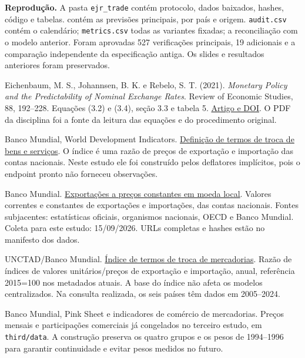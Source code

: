 \documentclass[10pt,a4paper]{article}
\newcommand{\pagina}[1]{\clearpage{\Large\bfseries\color{navy} #1}\par\vspace{6pt}}
\begin{document}
\textbf{Reprodução.} A pasta \texttt{ejr\_trade} contém protocolo, dados baixados, hashes, código e tabelas.  contém as previsões principais, por país e origem. \texttt{audit.csv} contém o calendário; \texttt{metrics.csv} todas as variantes fixadas;  a reconciliação com o modelo anterior. Foram aprovadas 527 verificações principais, 19 adicionais e a comparação independente da especificação antiga. Os slides e resultados anteriores foram preservados.

\pagina{Referências e definições de dados}
Eichenbaum, M. S., Johannsen, B. K. e Rebelo, S. T. (2021). \textit{Monetary Policy and the Predictability of Nominal Exchange Rates}. Review of Economic Studies, 88, 192--228. Equações (3.2) e (3.4), seção 3.3 e tabela 5. \href{https://doi.org/10.1093/restud/rdaa024}{Artigo e DOI}. O PDF da disciplina foi a fonte da leitura das equações e do procedimento original.

Banco Mundial, World Development Indicators. \href{https://databank.worldbank.org/metadataglossary/world-development-indicators/series/NE.TRM.TRAD.XU}{Definição de termos de troca de bens e serviços}. O índice é uma razão de preços de exportação e importação das contas nacionais. Neste estudo ele foi construído pelos deflatores implícitos, pois o endpoint pronto não forneceu observações.

Banco Mundial. \href{https://databank.worldbank.org/metadataglossary/world-development-indicators/series/NE.EXP.GNFS.KN}{Exportações a preços constantes em moeda local}. Valores correntes e constantes de exportações e importações, das contas nacionais. Fontes subjacentes: estatísticas oficiais, organismos nacionais, OECD e Banco Mundial. Coleta para este estudo: 15/09/2026. URLs completas e hashes estão no manifesto dos dados.

UNCTAD/Banco Mundial. \href{https://databank.worldbank.org/metadataglossary/world-development-indicators/series/TT.PRI.MRCH.XD.WD}{Índice de termos de troca de mercadorias}. Razão de índices de valores unitários/preços de exportação e importação, anual, referência 2015=100 nos metadados atuais. A base do índice não afeta os modelos centralizados. Na consulta realizada, os seis países têm dados em 2005--2024.

Banco Mundial, Pink Sheet e indicadores de comércio de mercadorias. Preços mensais e participações comerciais já congelados no terceiro estudo, em \texttt{third/data}. A construção preserva os quatro grupos e os pesos de 1994--1996 para garantir continuidade e evitar pesos medidos no futuro.
\end{document}
